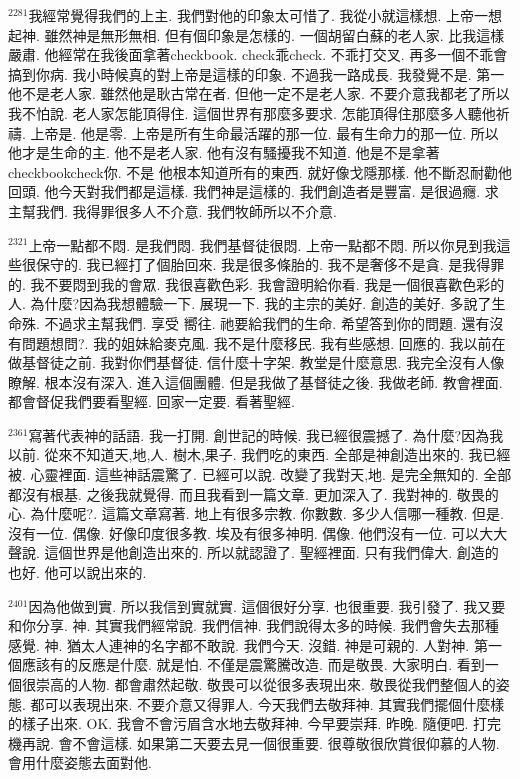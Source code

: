 \documentclass{book}
\begin{document}
$^{2281}$我經常覺得我們的上主.
我們對他的印象太可惜了.
我從小就這樣想.
上帝一想起神.
雖然神是無形無相.
但有個印象是怎樣的.
一個胡留白蘇的老人家.
比我這樣嚴肅.
他經常在我後面拿著checkbook.
check乖check.
不乖打交叉.
再多一個不乖會搞到你病.
我小時候真的對上帝是這樣的印象.
不過我一路成長.
我發覺不是.
第一他不是老人家.
雖然他是耿古常在者.
但他一定不是老人家.
不要介意我都老了所以我不怕說.
老人家怎能頂得住.
這個世界有那麼多要求.
怎能頂得住那麼多人聽他祈禱.
上帝是.
他是零.
上帝是所有生命最活躍的那一位.
最有生命力的那一位.
所以他才是生命的主.
他不是老人家.
他有沒有騷擾我不知道.
他是不是拿著checkbookcheck你.
不是 他根本知道所有的東西.
就好像戈隱那樣.
他不斷忍耐勸他回頭.
他今天對我們都是這樣.
我們神是這樣的.
我們創造者是豐富.
是很過癮.
求主幫我們.
我得罪很多人不介意.
我們牧師所以不介意.

$^{2321}$上帝一點都不悶.
是我們悶.
我們基督徒很悶.
上帝一點都不悶.
所以你見到我這些很保守的.
我已經打了個胎回來.
我是很多條胎的.
我不是奢侈不是貪.
是我得罪的.
我不要悶到我的會眾.
我很喜歡色彩.
我會證明給你看.
我是一個很喜歡色彩的人.
為什麼?因為我想體驗一下.
展現一下.
我的主宗的美好.
創造的美好.
多說了生命殊.
不過求主幫我們.
享受 嚮往.
祂要給我們的生命.
希望答到你的問題.
還有沒有問題想問?.
我的姐妹給麥克風.
我不是什麼移民.
我有些感想.
回應的.
我以前在做基督徒之前.
我對你們基督徒.
信什麼十字架.
教堂是什麼意思.
我完全沒有人像瞭解.
根本沒有深入.
進入這個團體.
但是我做了基督徒之後.
我做老師.
教會裡面.
都會督促我們要看聖經.
回家一定要.
看著聖經.

$^{2361}$寫著代表神的話語.
我一打開.
創世記的時候.
我已經很震撼了.
為什麼?因為我以前.
從來不知道天,地,人.
樹木,果子.
我們吃的東西.
全部是神創造出來的.
我已經被.
心靈裡面.
這些神話震驚了.
已經可以說.
改變了我對天,地.
是完全無知的.
全部都沒有根基.
之後我就覺得.
而且我看到一篇文章.
更加深入了.
我對神的.
敬畏的心.
為什麼呢?.
這篇文章寫著.
地上有很多宗教.
你數數.
多少人信哪一種教.
但是.
沒有一位.
偶像.
好像印度很多教.
埃及有很多神明.
偶像.
他們沒有一位.
可以大大聲說.
這個世界是他創造出來的.
所以就認證了.
聖經裡面.
只有我們偉大.
創造的也好.
他可以說出來的.

$^{2401}$因為他做到實.
所以我信到實就實.
這個很好分享.
也很重要.
我引發了.
我又要和你分享.
神.
其實我們經常說.
我們信神.
我們說得太多的時候.
我們會失去那種感覺.
神.
猶太人連神的名字都不敢說.
我們今天.
沒錯.
神是可親的.
人對神.
第一個應該有的反應是什麼.
就是怕.
不僅是震驚騰改造.
而是敬畏.
大家明白.
看到一個很崇高的人物.
都會肅然起敬.
敬畏可以從很多表現出來.
敬畏從我們整個人的姿態.
都可以表現出來.
不要介意又得罪人.
今天我們去敬拜神.
其實我們擺個什麼樣的樣子出來.
OK.
我會不會污眉含水地去敬拜神.
今早要崇拜.
昨晚.
隨便吧.
打完機再說.
會不會這樣.
如果第二天要去見一個很重要.
很尊敬很欣賞很仰慕的人物.
會用什麼姿態去面對他.
\end{document}
